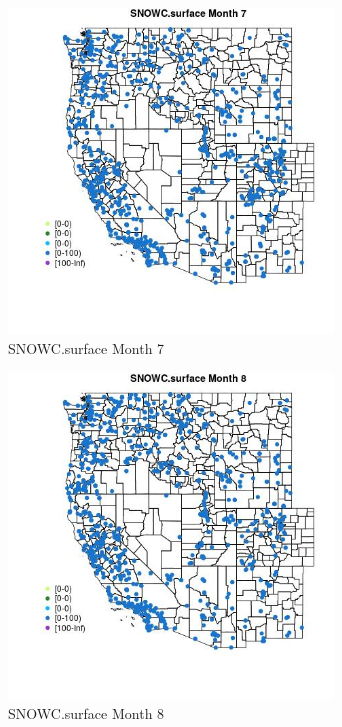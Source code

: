 \begin{figure} 
\centering  
\includegraphics[width=0.77\textwidth]{Code_Outputs/Report_ML_input_PM25_Step4_part_e_de_duplicated_aves_compiled_2019-05-21wNAs_MapObsMo7SNOWCsurface.jpg} 
\caption{\label{fig:Report_ML_input_PM25_Step4_part_e_de_duplicated_aves_compiled_2019-05-21wNAsMapObsMo7SNOWCsurface}SNOWC.surface Month 7} 
\end{figure} 
 

\begin{figure} 
\centering  
\includegraphics[width=0.77\textwidth]{Code_Outputs/Report_ML_input_PM25_Step4_part_e_de_duplicated_aves_compiled_2019-05-21wNAs_MapObsMo8SNOWCsurface.jpg} 
\caption{\label{fig:Report_ML_input_PM25_Step4_part_e_de_duplicated_aves_compiled_2019-05-21wNAsMapObsMo8SNOWCsurface}SNOWC.surface Month 8} 
\end{figure} 
 


